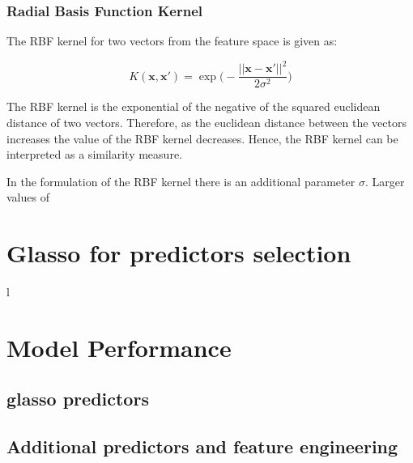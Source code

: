 \documentclass[11pt]{article}
\theoremstyle{definition}
\newcommand{\bx}{\mathbf{x}}
\begin{document}
\subsubsection{Radial Basis Function Kernel}

The RBF kernel for two vectors from the feature space is given as:

\begin{equation}
    K(\bx, \bx') = \exp{\Bigg(-\frac{||\bx - \bx'||^2}{2\sigma^2}\Bigg)}
\end{equation}

The RBF kernel is the exponential of the negative of the squared euclidean distance of two vectors. Therefore, as the euclidean distance between the vectors increases the value of the RBF kernel decreases. Hence, the RBF kernel can be interpreted as a similarity measure.

In the formulation of the RBF kernel there is an additional parameter $\sigma$. Larger values of 


\section{Glasso for predictors selection}
l
\section{Model Performance}

\subsection{glasso predictors}

\subsection{Additional predictors and feature engineering}

\newpage
\end{document}
